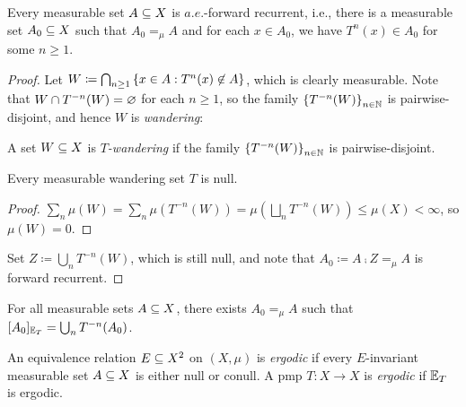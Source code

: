 \documentclass[reqno, twoside]{article}
\begin{document}
    \begin{theorem}\label{thm:poincare_recurrence}
        Every measurable set $A\subseteq X$ is $a.e.$-forward recurrent, i.e., there is a measurable set $A_0\subseteq X$ such that $A_0=_\mu A$ and for each $x\in A_0$, we have $T^n(x)\in A_0$ for some $n\geq1$.
    \end{theorem}
    \begin{proof}
        Let $W\coloneqq\bigcap_{n\geq1}\left\{x\in A: T^n(x)\not\in A\right\}$, which is clearly measurable. Note that $W\cap T^{-n}(W)=\varnothing$ for each $n\geq1$, so the family $\left\{T^{-n}(W)\right\}_{n\in\mathbb{N}}$ is pairwise-disjoint, and hence $W$ is \textit{wandering}:
        \begin{center}
            \begin{minipage}{0.95\textwidth}
                \begin{definition}
                    A set $W\subseteq X$ is \textit{$T$-wandering} if the family $\left\{T^{-n}(W)\right\}_{n\in\mathbb{N}}$ is pairwise-disjoint.
                \end{definition}
                \begin{lemma}
                    Every measurable wandering set $T$ is null.
                \end{lemma}
                \begin{proof}
                    $\sum_n\mu(W)=\sum_n\mu(T^{-n}(W))=\mu(\bigsqcup_nT^{-n}(W))\leq\mu(X)<\infty$, so $\mu(W)=0$.\qedlem
                \end{proof}
            \end{minipage}
        \end{center}
        Set $Z\coloneqq\bigcup_nT^{-n}(W)$, which is still null, and note that $A_0\coloneqq A\comp Z=_\mu A$ is forward recurrent.
    \end{proof}

    \begin{corollary}\label{cor:saturation_almost_measurable}
        For all measurable sets $A\subseteq X$, there exists $A_0=_\mu A$ such that $[A_0]_{\mathbb{E}_T}=\bigcup_nT^{-n}(A_0)$.
    \end{corollary}

    \begin{definition}
        An equivalence relation $E\subseteq X^2$ on $(X,\mu)$ is \textit{ergodic} if every $E$-invariant measurable set $A\subseteq X$ is either null or conull. A pmp $T:X\to X$ is \textit{ergodic} if $\mathbb{E}_T$ is ergodic.
    \end{definition}
\end{document}
